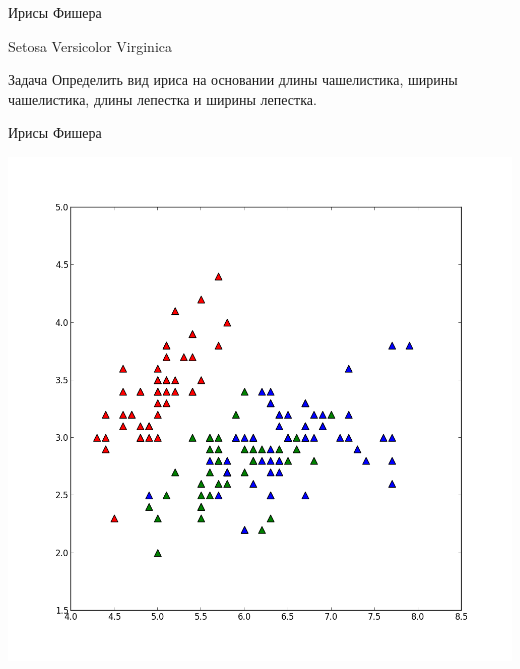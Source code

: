 \documentclass[aspectratio=169]{beamer}
\begin{document}
\begin{frame}{Ирисы Фишера}
\begin{center}
\end{center}
{\large \hspace{4.5em} Setosa \hspace{3.3em} Versicolor \hspace{2.5em} Virginica}

\begin{exampleblock}{Задача}
Определить вид ириса на основании длины чашелистика, ширины чашелистика, длины лепестка и ширины лепестка.
\end{exampleblock}

\end{frame}

\begin{frame}{Ирисы Фишера}

\begin{center}
\includegraphics[scale=0.2]{images/iris01.png} \;

\end{center}
\end{frame}
\end{document}
